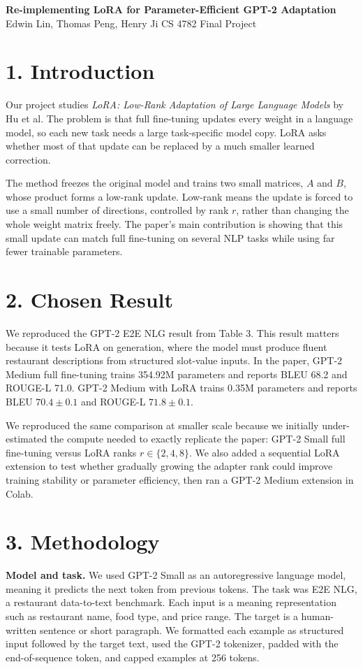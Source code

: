 \documentclass[11pt]{article}
\begin{document}
\begin{center}
{\large \textbf{Re-implementing LoRA for Parameter-Efficient GPT-2 Adaptation}}\\
Edwin Lin, Thomas Peng, Henry Ji \hfill CS 4782 Final Project
\end{center}
\vspace{-6pt}

\section{1. Introduction}
Our project studies \textit{LoRA: Low-Rank Adaptation of Large Language Models} by Hu et al. The problem is that full fine-tuning updates every weight in a language model, so each new task needs a large task-specific model copy. LoRA asks whether most of that update can be replaced by a much smaller learned correction.

The method freezes the original model and trains two small matrices, $A$ and $B$, whose product forms a low-rank update. Low-rank means the update is forced to use a small number of directions, controlled by rank $r$, rather than changing the whole weight matrix freely. The paper's main contribution is showing that this small update can match full fine-tuning on several NLP tasks while using far fewer trainable parameters.

\section{2. Chosen Result}
We reproduced the GPT-2 E2E NLG result from Table 3. This result matters because it tests LoRA on generation, where the model must produce fluent restaurant descriptions from structured slot-value inputs. In the paper, GPT-2 Medium full fine-tuning trains 354.92M parameters and reports BLEU 68.2 and ROUGE-L 71.0. GPT-2 Medium with LoRA trains 0.35M parameters and reports BLEU $70.4 \pm 0.1$ and ROUGE-L $71.8 \pm 0.1$.

We reproduced the same comparison at smaller scale because we initially under-estimated the compute needed to exactly replicate the paper: GPT-2 Small full fine-tuning versus LoRA ranks $r \in \{2,4,8\}$. We also added a sequential LoRA extension to test whether gradually growing the adapter rank could improve training stability or parameter efficiency, then ran a GPT-2 Medium extension in Colab.

\section{3. Methodology}
\textbf{Model and task.} We used GPT-2 Small as an autoregressive language model, meaning it predicts the next token from previous tokens. The task was E2E NLG, a restaurant data-to-text benchmark. Each input is a meaning representation such as restaurant name, food type, and price range. The target is a human-written sentence or short paragraph. We formatted each example as structured input followed by the target text, used the GPT-2 tokenizer, padded with the end-of-sequence token, and capped examples at 256 tokens.
\end{document}

